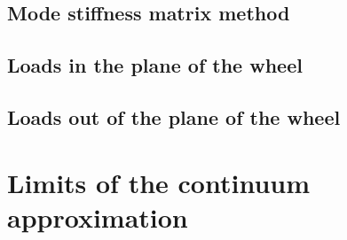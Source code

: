 \documentclass[\rootdir/thesis.tex]{subfiles}
\begin{document}
\subsection{Mode stiffness matrix method}



\subsection{Loads in the plane of the wheel}



\subsection{Loads out of the plane of the wheel}



\section{Limits of the continuum approximation}
\end{document}
